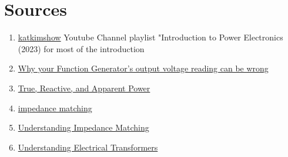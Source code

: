 \section{Sources}
\begin{enumerate}
    \item \href{https://www.youtube.com/watch?v=hRAyfJLZnC0&list=PLmK1EnKxphinxBub5hL0ZoJXWoqjkGE19}{katkimshow} Youtube Channel playlist "Introduction to Power Electronics (2023) for most of the introduction
    \item \href{https://www.youtube.com/watch?v=tClE8s6RZdg}{Why your Function Generator's output voltage reading can be wrong}
    \item \href{https://www.allaboutcircuits.com/textbook/alternating-current/chpt-11/true-reactive-and-apparent-power/}{True, Reactive, and Apparent Power}
    \item \href{https://www.analog.com/en/resources/glossary/impedance-matching.html}{impedance matching}
    \item \href{https://eepower.com/technical-articles/understanding-impedance-matching/#}{Understanding Impedance Matching}
    \item \href{https://eepower.com/power-electronics-textbook/vol-i-electrical-power-systems-design/chapter-5-impedance-matching-and-power-transfer/understanding-electrical-transformers/#}{Understanding Electrical Transformers}
\end{enumerate}